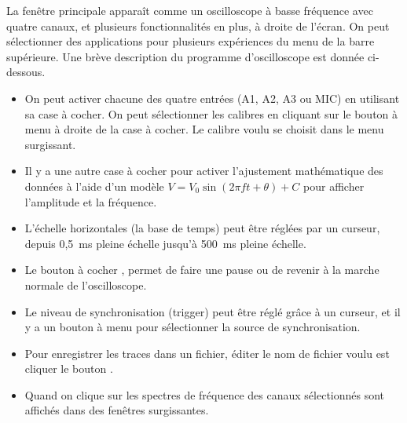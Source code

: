 \documentclass[a4paper,12pt,french]{sphinxmanual}
\begin{document}
La fenêtre principale apparaît comme un oscilloscope à basse fréquence
avec quatre canaux, et plusieurs fonctionnalités en plus, à droite
de l’écran. On peut sélectionner des applications pour plusieurs expériences
du menu de la barre supérieure. Une brève description du programme
d’oscilloscope est donnée ci-dessous.
\begin{itemize}
\item {} 
On peut activer chacune des quatre entrées (A1, A2, A3 ou MIC) en
utilisant sa case à cocher. On peut sélectionner les calibres en cliquant
sur le bouton à menu à droite de la case à cocher. Le calibre voulu
se choisit dans le menu surgissant.

\item {} 
Il y a une autre case à cocher pour activer l’ajustement mathématique
des données à l’aide d’un
modèle \(V = V_{0} \sin (2\pi ft + \theta) + C\)
pour afficher l’amplitude et la fréquence.

\item {} 
L’échelle horizontales (la base de temps) peut être réglées par un
curseur, depuis 0,5 ms pleine échelle jusqu’à 500 ms pleine échelle.

\item {} 
Le bouton à cocher , permet de faire une pause ou de
revenir à la marche normale de l’oscilloscope.

\item {} 
Le niveau de synchronisation (trigger) peut être réglé grâce à un
curseur, et il y a un bouton à menu pour sélectionner la source de
synchronisation.

\item {} 
Pour enregistrer les traces dans un fichier, éditer le nom de fichier
voulu est cliquer le bouton .

\item {} 
Quand on clique sur  les spectres de fréquence des canaux
sélectionnés sont affichés dans des fenêtres surgissantes.

\end{itemize}
\end{document}
